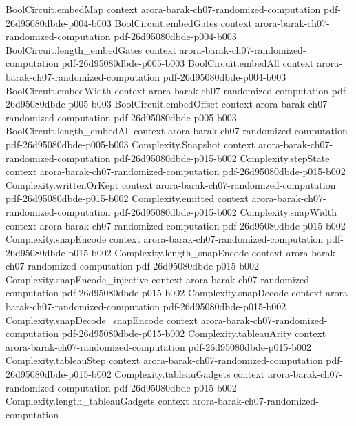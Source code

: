 \begin{theorem}
\proofstep
  {BoolCircuit.embedMap}
  {context}
  {arora-barak-ch07-randomized-computation}
  {pdf-26d95080dbde-p004-b003}
\proofstep
  {BoolCircuit.embedGates}
  {context}
  {arora-barak-ch07-randomized-computation}
  {pdf-26d95080dbde-p004-b003}
\proofstep
  {BoolCircuit.length_embedGates}
  {context}
  {arora-barak-ch07-randomized-computation}
  {pdf-26d95080dbde-p005-b003}
\proofstep
  {BoolCircuit.embedAll}
  {context}
  {arora-barak-ch07-randomized-computation}
  {pdf-26d95080dbde-p004-b003}
\proofstep
  {BoolCircuit.embedWidth}
  {context}
  {arora-barak-ch07-randomized-computation}
  {pdf-26d95080dbde-p005-b003}
\proofstep
  {BoolCircuit.embedOffset}
  {context}
  {arora-barak-ch07-randomized-computation}
  {pdf-26d95080dbde-p005-b003}
\proofstep
  {BoolCircuit.length_embedAll}
  {context}
  {arora-barak-ch07-randomized-computation}
  {pdf-26d95080dbde-p005-b003}
\proofstep
  {Complexity.Snapshot}
  {context}
  {arora-barak-ch07-randomized-computation}
  {pdf-26d95080dbde-p015-b002}
\proofstep
  {Complexity.stepState}
  {context}
  {arora-barak-ch07-randomized-computation}
  {pdf-26d95080dbde-p015-b002}
\proofstep
  {Complexity.writtenOrKept}
  {context}
  {arora-barak-ch07-randomized-computation}
  {pdf-26d95080dbde-p015-b002}
\proofstep
  {Complexity.emitted}
  {context}
  {arora-barak-ch07-randomized-computation}
  {pdf-26d95080dbde-p015-b002}
\proofstep
  {Complexity.snapWidth}
  {context}
  {arora-barak-ch07-randomized-computation}
  {pdf-26d95080dbde-p015-b002}
\proofstep
  {Complexity.snapEncode}
  {context}
  {arora-barak-ch07-randomized-computation}
  {pdf-26d95080dbde-p015-b002}
\proofstep
  {Complexity.length_snapEncode}
  {context}
  {arora-barak-ch07-randomized-computation}
  {pdf-26d95080dbde-p015-b002}
\proofstep
  {Complexity.snapEncode_injective}
  {context}
  {arora-barak-ch07-randomized-computation}
  {pdf-26d95080dbde-p015-b002}
\proofstep
  {Complexity.snapDecode}
  {context}
  {arora-barak-ch07-randomized-computation}
  {pdf-26d95080dbde-p015-b002}
\proofstep
  {Complexity.snapDecode_snapEncode}
  {context}
  {arora-barak-ch07-randomized-computation}
  {pdf-26d95080dbde-p015-b002}
\proofstep
  {Complexity.tableauArity}
  {context}
  {arora-barak-ch07-randomized-computation}
  {pdf-26d95080dbde-p015-b002}
\proofstep
  {Complexity.tableauStep}
  {context}
  {arora-barak-ch07-randomized-computation}
  {pdf-26d95080dbde-p015-b002}
\proofstep
  {Complexity.tableauGadgets}
  {context}
  {arora-barak-ch07-randomized-computation}
  {pdf-26d95080dbde-p015-b002}
\proofstep
  {Complexity.length_tableauGadgets}
  {context}
  {arora-barak-ch07-randomized-computation}

\end{theorem}
